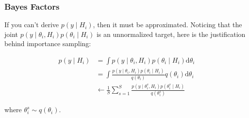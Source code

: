 \documentclass{beamer}
\begin{document}
\begin{frame}
\frametitle{Bayes Factors}

If you can't derive $p(y \mid H_i)$, then it must be approximated. Noticing that the joint $p(y \mid \theta_i, H_i)p(\theta_i \mid H_i)$ is an unnormalized target, here is the justification behind importance sampling:

\begin{align*}
p(y \mid H_i) &= \int p(y \mid \theta_i, H_i)p(\theta_i \mid H_i) \text{d}\theta_i \\
&= \int \frac{p(y \mid \theta_i, H_i)p(\theta_i \mid H_i)}{q(\theta_i)}q(\theta_i) \text{d}\theta_i \\
&\leftarrow \frac{1}{S}\sum_{s=1}^S \frac{p(y \mid \theta^s_i, H_i)p(\theta^s_i \mid H_i)}{q(\theta^s_i)}
\end{align*}

where $\theta^s_i \sim q(\theta_i)$.
\newline

\end{frame}





\end{document}
